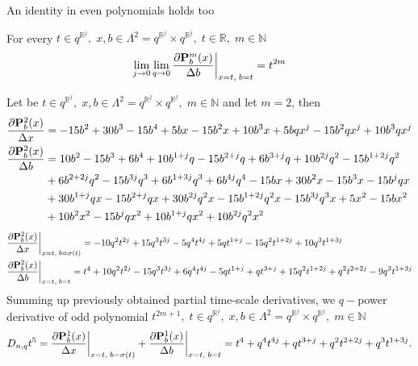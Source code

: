 An identity in even polynomials holds too
\begin{cor}
    \label{time_scale_pure_quantum_power_corollary_2}
    For every $t\in q^{\mathbb{R}^j}, \; x,b\in\Lambda^2 = q^{\mathbb{R}^j} \times q^{\mathbb{R}^j}, \; t\in\mathbb{R}, \; m\in\mathbb{N}$
    \[
        \lim \limits_{j \to 0} \lim \limits_{q \to 0} \frac{\partial {\mathbf{P}}\sp{m} \sb{b}(x)}{\Delta b} \bigg |_{x = t, \; b = t}
        = t^{2m}
    \]
\end{cor}

\begin{examp}
    \label{time_scale_pure_quantum_power_example_2}
    Let be $t\in q^{\mathbb{R}^j}, \; x,b\in\Lambda^2 = q^{\mathbb{R}^j} \times q^{\mathbb{R}^j}, \; m\in\mathbb{N}$ and let $m=2$, then
    \begin{align*}
        \frac{\partial {\mathbf{P}}\sp{2} \sb{b}(x)}{\Delta x}
        &= -15 b^2 + 30 b^3 - 15 b^4 + 5 b x - 15 b^2 x + 10 b^3 x + 5 b q x^j - 15 b^2 q x^j + 10 b^3 q x^j \\
        \frac{\partial {\mathbf{P}}\sp{2} \sb{b}(x)}{\Delta b}
        &= 10 b^2 - 15 b^3 + 6 b^4 + 10 b^{1 + j} q - 15 b^{2 + j} q + 6 b^{3 + j} q + 10 b^{2 j} q^2 - 15 b^{1 + 2 j} q^2 \\
        &+ 6 b^{2 + 2 j} q^2 - 15 b^{3 j} q^3 + 6 b^{1 + 3 j} q^3 + 6 b^{4 j} q^4 - 15 b x + 30 b^2 x - 15 b^3 x - 15 b^j q x \\
        &+ 30 b^{1 + j} q x - 15 b^{2 + j} q x + 30 b^{2 j} q^2 x - 15 b^{1 + 2 j} q^2 x - 15 b^{3 j} q^3 x + 5 x^2 - 15 b x^2 \\
        &+ 10 b^2 x^2 - 15 b^j q x^2 + 10 b^{1 + j} q x^2 + 10 b^{2 j} q^2 x^2
    \end{align*}
    \begin{align*}
        &\frac{\partial {\mathbf{P}}\sp{2} \sb{b}(x)}{\Delta x} \bigg |_{x = t, \; b = \sigma(t)}
        = -10 q^2 t^{2 j} + 15 q^3 t^{3 j} - 5 q^4 t^{4 j} + 5 q t^{1 + j} - 15 q^2 t^{1 + 2 j} + 10 q^3 t^{1 + 3 j} \\
        &\frac{\partial {\mathbf{P}}\sp{2} \sb{b}(x)}{\Delta b} \bigg |_{x = t, \; b = t}
        = t^4 + 10 q^2 t^{2 j} - 15 q^3 t^{3 j} + 6 q^4 t^{4 j} - 5 q t^{1 + j} + q t^{3 + j} + 15 q^2 t^{1 + 2 j}
        + q^2 t^{2 + 2 j} - 9 q^3 t^{1 + 3 j}
    \end{align*}
    Summing up previously obtained partial time-scale derivatives, we $q-$power derivative of odd polynomial
    $t^{2m+1}, \; t\in q^{\mathbb{R}^j}, \; x,b\in\Lambda^2 = q^{\mathbb{R}^j} \times q^{\mathbb{R}^j}, \; m\in\mathbb{N}$
    \[
        D_{n,q} t^{5}
        = \frac{\partial {\mathbf{P}}\sp{1} \sb{b}(x)}{\Delta x} \bigg |_{x = t, \; b = \sigma(t)}
        + \frac{\partial {\mathbf{P}}\sp{1} \sb{b}(x)}{\Delta b} \bigg |_{x = t, \; b = t}
        = t^4 + q^4 t^{4 j} + q t^{3 + j} + q^2 t^{2 + 2 j} + q^3 t^{1 + 3 j}.
    \]
\end{examp}